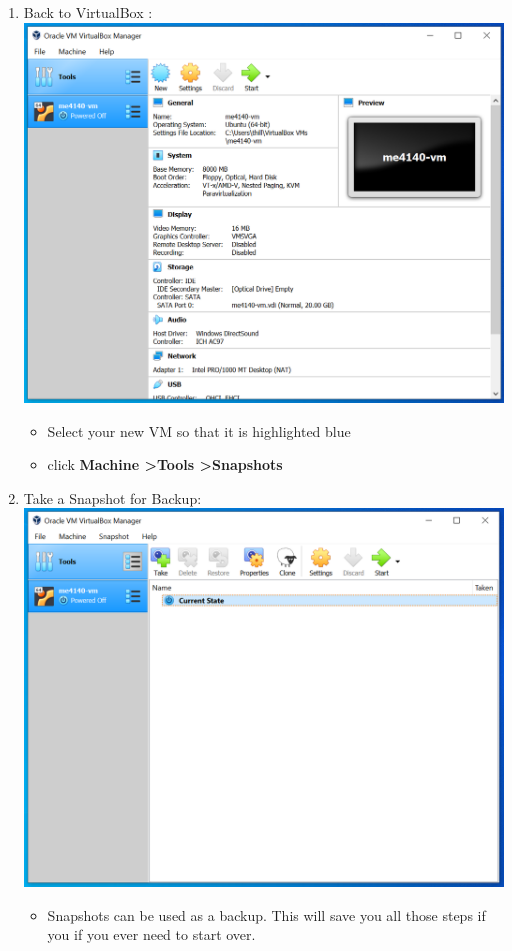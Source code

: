 \documentclass[12pt]{article}
\begin{document}
\begin{description}
\begin{description}
\begin{enumerate}
    		\newpage
    		\item Back to VirtualBox : \vspace{5mm} \\
      		\includegraphics[scale=.50]{CaptureY.png}
      		 \begin{itemize}
        	\item Select your new VM so that it is highlighted blue
        	\item click {\bf Machine \textgreater Tools \textgreater Snapshots} 
    		\end{itemize} 
    		 \vspace{5mm} 
    		 
    		\item Take a Snapshot for Backup: \vspace{5mm} \\
      		\includegraphics[scale=.50]{Capture27.png}
      		 \begin{itemize}
      		\item Snapshots can be used as a backup. This will save you all those steps if you if you ever need to start over.  
         

\end{itemize}
\end{enumerate}
\end{description}
\end{description}
\end{document}

